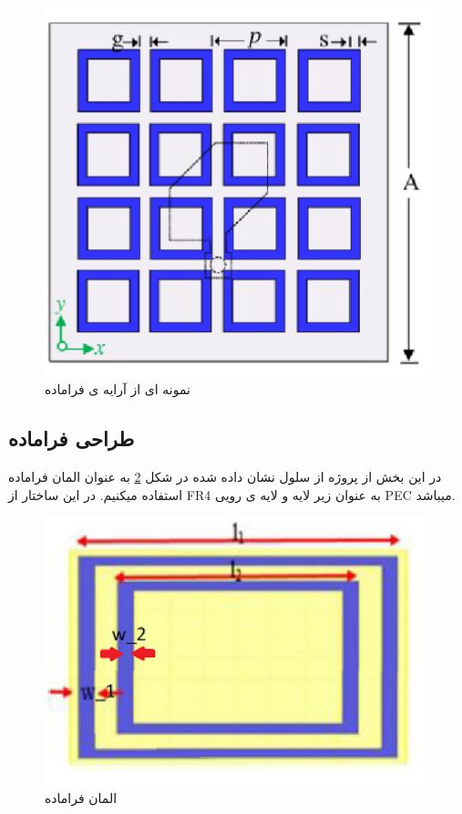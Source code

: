 \begin{figure}
	\centering
	\includegraphics[scale=0.5]{Images/fig36.png}
	\caption{نمونه ای از آرایه ی فراماده}
	\label{fig36}
\end{figure}



\subsection{طراحی فراماده}
در این بخش از پروژه از سلول نشان داده شده در شکل
\ref{fig37}
 به عنوان المان فراماده استفاده میکنیم. در این ساختار از FR4 به عنوان زیر لایه و لایه ی رویی PEC میباشد.
\begin{figure}
	\centering
	\includegraphics[scale=0.5]{Images/fig37.png}
	\caption{المان فراماده}
	\label{fig37}
\end{figure}

